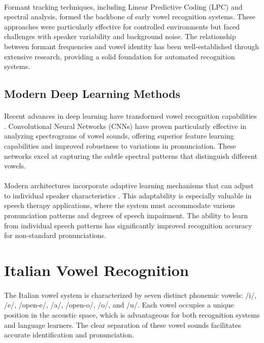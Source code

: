 \paragraph{}
Formant tracking techniques, including Linear Predictive Coding (LPC) and spectral analysis, formed the backbone of early vowel recognition systems. These approaches were particularly effective for controlled environments but faced challenges with speaker variability and background noise. The relationship between formant frequencies and vowel identity has been well-established through extensive research, providing a solid foundation for automated recognition systems.

\subsection{Modern Deep Learning Methods}
\label{subsec:deeplearning}

\paragraph{}
Recent advances in deep learning have transformed vowel recognition capabilities \cite{cnn_speech2022}. Convolutional Neural Networks (CNNs) have proven particularly effective in analyzing spectrograms of vowel sounds, offering superior feature learning capabilities and improved robustness to variations in pronunciation. These networks excel at capturing the subtle spectral patterns that distinguish different vowels.

\paragraph{}
Modern architectures incorporate adaptive learning mechanisms that can adjust to individual speaker characteristics \cite{adaptive_learning2023}. This adaptability is especially valuable in speech therapy applications, where the system must accommodate various pronunciation patterns and degrees of speech impairment. The ability to learn from individual speech patterns has significantly improved recognition accuracy for non-standard pronunciations.

\section{Italian Vowel Recognition}
\label{sec:italian_vowels}

\paragraph{}
The Italian vowel system is characterized by seven distinct phonemic vowels: /i/, /e/, /open-e/, /a/, /open-o/, /o/, and /u/. Each vowel occupies a unique position in the acoustic space, which is advantageous for both recognition systems and language learners. The clear separation of these vowel sounds facilitates accurate identification and pronunciation.

